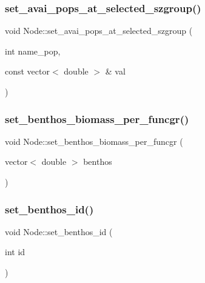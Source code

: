 \mbox{\label{class_node_a1bfd5539b72ad196382ec0a18d0b97ba}} 
\subsubsection{\texorpdfstring{set\_avai\_pops\_at\_selected\_szgroup()}{set\_avai\_pops\_at\_selected\_szgroup()}}
{\footnotesize\ttfamily void Node\+::set\+\_\+avai\+\_\+pops\+\_\+at\+\_\+selected\+\_\+szgroup (\begin{DoxyParamCaption}\item[{int}]{name\+\_\+pop,  }\item[{const vector$<$ double $>$ \&}]{val }\end{DoxyParamCaption})}

\mbox{\label{class_node_a949054e59f4651d1b724147c23882b90}} 
\subsubsection{\texorpdfstring{set\_benthos\_biomass\_per\_funcgr()}{set\_benthos\_biomass\_per\_funcgr()}}
{\footnotesize\ttfamily void Node\+::set\+\_\+benthos\+\_\+biomass\+\_\+per\+\_\+funcgr (\begin{DoxyParamCaption}\item[{vector$<$ double $>$}]{benthos }\end{DoxyParamCaption})}

\mbox{\label{class_node_a0eeffd50a8278822d7fd2fe8c8aeeede}} 
\subsubsection{\texorpdfstring{set\_benthos\_id()}{set\_benthos\_id()}}
{\footnotesize\ttfamily void Node\+::set\+\_\+benthos\+\_\+id (\begin{DoxyParamCaption}\item[{int}]{id }\end{DoxyParamCaption})}

